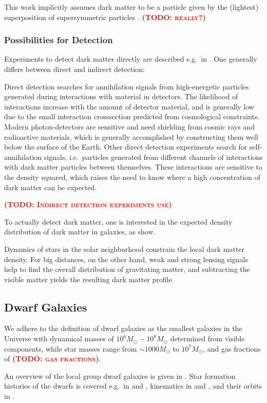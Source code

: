 \documentclass[useAMS,usenatbib]{mn2e}
\newcommand{\TODO}[1]{\textsc{\textbf{\textcolor{red}{(TODO: #1)}}}}
\begin{document}
This work implicitly assumes dark matter to be a particle given by the
(lightest) superposition of supersymmetric particles
\citep{Jungman1996}. \TODO{really?}

\subsubsection{Possibilities for Detection}
Experiments to detect dark matter directly are described e.g.\ in
\cite{Schnee2011}. One generally differs between direct and indirect
detection:

Direct detection searches for annihilation signals from high-energetic
particles generated during interactions with material in
detectors. The likelihood of interactions increase with the amount of
detector material, and is generally low due to the small interaction
crosssection predicted from cosmological constraints. Modern
photon-detectors are sensitive and need shielding from cosmic rays and
radioactive materials, which is generally accomplished by constructing
them well below the surface of the Earth. Other direct detection
experiments search for self-annihilation signals, i.e.\ particles
generated from different channels of interactions with dark matter
particles between themselves. These interactions are sensitive to the
density squared, which raises the need to know where a high
concentration of dark matter can be expected.

\TODO{Indirect detection experiments use}


To actually detect dark matter, one is interested in the expected
density distribution of dark matter in galaxies, as
\cite{Navarro1996} show.

Dynamics of stars in the solar neighborhood constrain the local dark
matter density. For big distances, on the other hand, weak and strong
lensing signals help to find the overall distribution of gravitating
matter, and subtracting the visible matter yields the
resulting dark matter profile.

\subsection{Dwarf Galaxies}
We adhere to the definition of dwarf galaxies as the smallest galaxies
in the Universe with dynamical masses of $10^6M_\odot-10^8M_\odot$
determined from visible components, while star masses range from
$\sim1000M_\odot$ to $10^7M_\odot$, and gas fractions of \TODO{gas
  fractions}.

An overview of the local group dwarf galaxies is given in
\cite{Mateo1998}. Star formation histories of the dwarfs is covered
e.g.\ in \cite{Skillman2005} and \cite{Dolphin2005}, kinematics in
\cite{Walker2009} and \cite{Simon2007}, and their orbits in
\cite{Lux2010}.
\end{document}
